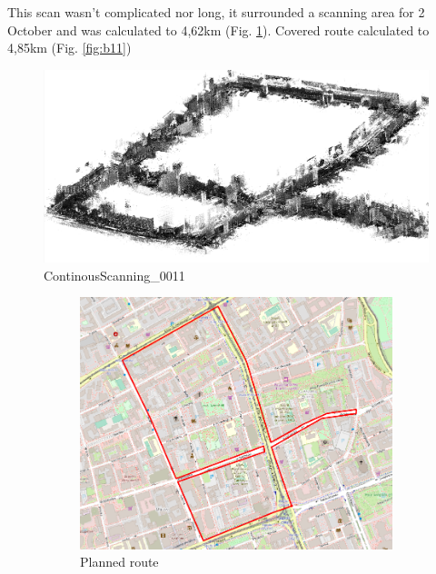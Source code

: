 \documentclass[a4paper,12pt]{book}
\begin{document}
\begin{enumerate}
	This scan wasn't complicated nor long, it surrounded a scanning area for 2 October and was calculated to 4,62km (Fig. \ref{fig:a11}). Covered route calculated to 4,85km (Fig. \ref{fig:b11})
	\begin{figure}[H]
		\includegraphics[width=1\linewidth]{cloud11}
		\caption{ContinousScanning\_0011}
	\end{figure}
	\begin{figure}[H]
		\centering
		\begin{subfigure}{.88\textwidth}
			\centering
			\includegraphics[width=1\linewidth]{route_p11}
			\caption{Planned route}
			\label{fig:a11}
		\end{subfigure}%
		\linebreak
		\begin{subfigure}{.88\textwidth}
			\centering

\end{subfigure}
\end{figure}
\end{enumerate}
\end{document}
